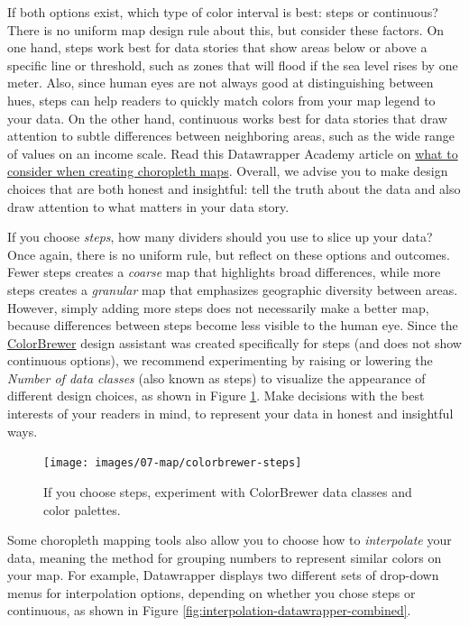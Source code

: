 \documentclass[
  english,
]{book}
\begin{document}
If both options exist, which type of color interval is best: steps or continuous? There is no uniform map design rule about this, but consider these factors. On one hand, steps work best for data stories that show areas below or above a specific line or threshold, such as zones that will flood if the sea level rises by one meter. Also, since human eyes are not always good at distinguishing between hues, steps can help readers to quickly match colors from your map legend to your data. On the other hand, continuous works best for data stories that draw attention to subtle differences between neighboring areas, such as the wide range of values on an income scale. Read this Datawrapper Academy article on \href{https://academy.datawrapper.de/article/134-what-to-consider-when-creating-choropleth-maps}{what to consider when creating choropleth maps}. Overall, we advise you to make design choices that are both honest and insightful: tell the truth about the data and also draw attention to what matters in your data story.

If you choose \emph{steps}, how many dividers should you use to slice up your data? Once again, there is no uniform rule, but reflect on these options and outcomes. Fewer steps creates a \emph{coarse} map that highlights broad differences, while more steps creates a \emph{granular} map that emphasizes geographic diversity between areas. However, simply adding more steps does not necessarily make a better map, because differences between steps become less visible to the human eye. Since the \href{https://colorbrewer2.org}{ColorBrewer} design assistant was created specifically for steps (and does not show continuous options), we recommend experimenting by raising or lowering the \emph{Number of data classes} (also known as steps) to visualize the appearance of different design choices, as shown in Figure \ref{fig:colorbrewer-steps}. Make decisions with the best interests of your readers in mind, to represent your data in honest and insightful ways.



\begin{figure}
\texttt{[image: images/07-map/colorbrewer-steps]} \caption{If you choose steps, experiment with ColorBrewer data classes and color palettes.}\label{fig:colorbrewer-steps}
\end{figure}

Some choropleth mapping tools also allow you to choose how to \emph{interpolate} your data, meaning the method for grouping numbers to represent similar colors on your map. For example, Datawrapper displays two different sets of drop-down menus for interpolation options, depending on whether you chose steps or continuous, as shown in Figure \ref{fig:interpolation-datawrapper-combined}.
\end{document}
